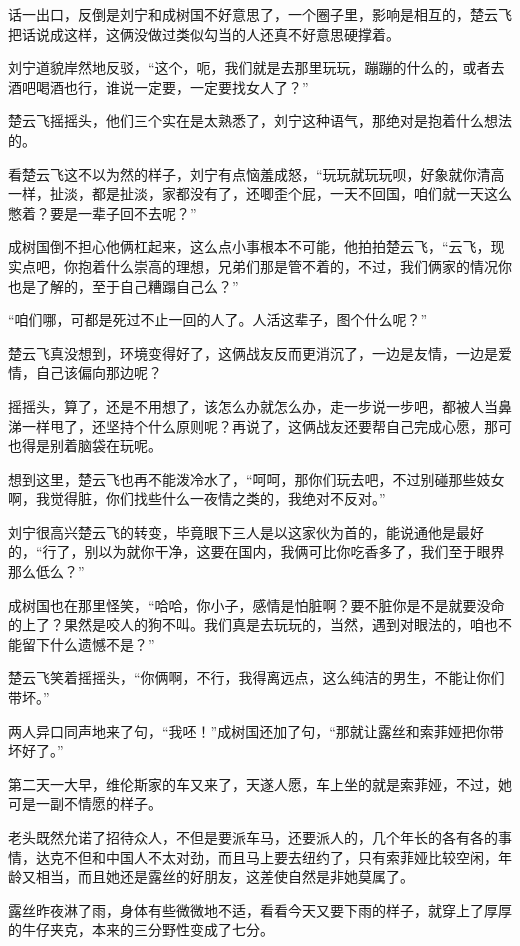 话一出口，反倒是刘宁和成树国不好意思了，一个圈子里，影响是相互的，楚云飞把话说成这样，这俩没做过类似勾当的人还真不好意思硬撑着。

刘宁道貌岸然地反驳，“这个，呃，我们就是去那里玩玩，蹦蹦的什么的，或者去酒吧喝酒也行，谁说一定要，一定要找女人了？”

楚云飞摇摇头，他们三个实在是太熟悉了，刘宁这种语气，那绝对是抱着什么想法的。

看楚云飞这不以为然的样子，刘宁有点恼羞成怒，“玩玩就玩玩呗，好象就你清高一样，扯淡，都是扯淡，家都没有了，还唧歪个屁，一天不回国，咱们就一天这么憋着？要是一辈子回不去呢？”

成树国倒不担心他俩杠起来，这么点小事根本不可能，他拍拍楚云飞，“云飞，现实点吧，你抱着什么崇高的理想，兄弟们那是管不着的，不过，我们俩家的情况你也是了解的，至于自己糟蹋自己么？”

“咱们哪，可都是死过不止一回的人了。人活这辈子，图个什么呢？”

楚云飞真没想到，环境变得好了，这俩战友反而更消沉了，一边是友情，一边是爱情，自己该偏向那边呢？

摇摇头，算了，还是不用想了，该怎么办就怎么办，走一步说一步吧，都被人当鼻涕一样甩了，还坚持个什么原则呢？再说了，这俩战友还要帮自己完成心愿，那可也得是别着脑袋在玩呢。

想到这里，楚云飞也再不能泼冷水了，“呵呵，那你们玩去吧，不过别碰那些妓女啊，我觉得脏，你们找些什么一夜情之类的，我绝对不反对。”

刘宁很高兴楚云飞的转变，毕竟眼下三人是以这家伙为首的，能说通他是最好的，“行了，别以为就你干净，这要在国内，我俩可比你吃香多了，我们至于眼界那么低么？”

成树国也在那里怪笑，“哈哈，你小子，感情是怕脏啊？要不脏你是不是就要没命的上了？果然是咬人的狗不叫。我们真是去玩玩的，当然，遇到对眼法的，咱也不能留下什么遗憾不是？”

楚云飞笑着摇摇头，“你俩啊，不行，我得离远点，这么纯洁的男生，不能让你们带坏。”

两人异口同声地来了句，“我呸！”成树国还加了句，“那就让露丝和索菲娅把你带坏好了。”

第二天一大早，维伦斯家的车又来了，天遂人愿，车上坐的就是索菲娅，不过，她可是一副不情愿的样子。

老头既然允诺了招待众人，不但是要派车马，还要派人的，几个年长的各有各的事情，达克不但和中国人不太对劲，而且马上要去纽约了，只有索菲娅比较空闲，年龄又相当，而且她还是露丝的好朋友，这差使自然是非她莫属了。

露丝昨夜淋了雨，身体有些微微地不适，看看今天又要下雨的样子，就穿上了厚厚的牛仔夹克，本来的三分野性变成了七分。

